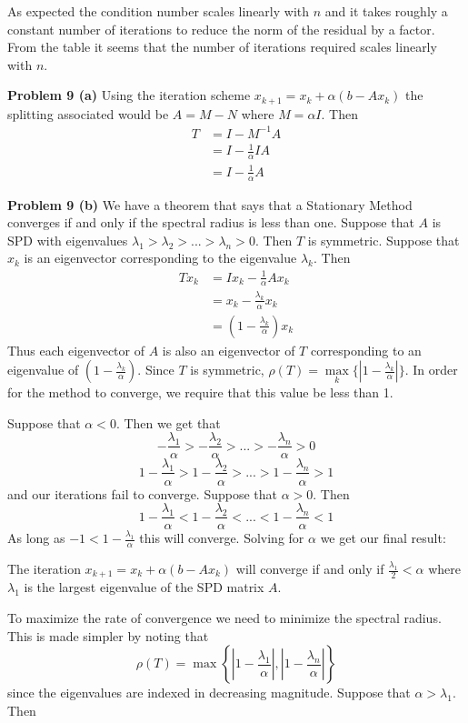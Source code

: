 \documentclass[12pt]{article}
\newcommand{\problem}[1]{\hspace{-4 ex} \large \textbf{Problem #1} }
\begin{document}
As expected the condition number scales linearly with $n$ and it takes roughly a constant number of iterations to reduce the norm of the residual by a factor. From the table it seems that the number of iterations required scales linearly with $n$. 

\problem{9 (a)} Using the iteration scheme $x_{k+1} = x_k + \alpha(b-Ax_k)$ the splitting associated would be $A= M-N$ where $M = \alpha I$. Then 
\begin{align*}
	T & = I - M^{-1}A \\
	& = I - \frac{1}{\alpha}IA \\
	& = I - \frac{1}{\alpha}A
\end{align*}

\problem{9 (b)} We have a theorem that says that a Stationary Method converges if and only if the spectral radius is less than one. Suppose that $A$ is SPD with eigenvalues $\lambda_1 > \lambda_2 > ... > \lambda_n > 0$. Then $T$ is symmetric. Suppose that $x_k$ is an eigenvector corresponding to the eigenvalue $\lambda_k$. Then
\begin{align*}
	Tx_k & = Ix_k - \frac{1}{\alpha}Ax_k \\
	& = x_k - \frac{\lambda_k}{\alpha}x_k \\
	& = \left(1-\frac{\lambda_k}{\alpha} \right)x_k
\end{align*}
Thus each eigenvector of $A$ is also an eigenvector of $T$ corresponding to an eigenvalue of $\left(1-\frac{\lambda_k}{\alpha} \right)$. Since $T$ is symmetric, $\rho(T) = \max\limits_k \{ \left\vert 1-\frac{\lambda_k}{\alpha} \right \vert \}$. In order for the method to converge, we require that this value be less than 1. \bigbreak

Suppose that $\alpha < 0$. Then we get that 
$$
-\frac{\lambda_1}{\alpha} > -\frac{\lambda_2}{\alpha} > ... > -\frac{\lambda_n}{\alpha} > 0
$$
$$
1-\frac{\lambda_1}{\alpha} > 1-\frac{\lambda_2}{\alpha} > ... > 1-\frac{\lambda_n}{\alpha} > 1
$$
and our iterations fail to converge.
Suppose that $\alpha > 0$. Then
$$
1-\frac{\lambda_1}{\alpha} < 1-\frac{\lambda_2}{\alpha} < ... < 1-\frac{\lambda_n}{\alpha} < 1
$$
As long as $-1 < 1-\frac{\lambda_1}{\alpha}$ this will converge. Solving for $\alpha$ we get our final result: \bigbreak

The iteration $x_{k+1} = x_k + \alpha(b-Ax_k)$ will converge if and only if $\frac{\lambda_1}{2} < \alpha$ where $\lambda_1$ is the largest eigenvalue of the SPD matrix $A$. \bigbreak

To maximize the rate of convergence we need to minimize the spectral radius. This is made simpler by noting that 
$$
\rho(T) = \max \left\{  \left\vert 1-\frac{\lambda_1}{\alpha} \right\vert, \left\vert 1 - \frac{\lambda_n}{\alpha}\right\vert \right \}
$$
since the eigenvalues are indexed in decreasing magnitude. Suppose that $\alpha > \lambda_1$. Then 
\end{document}
